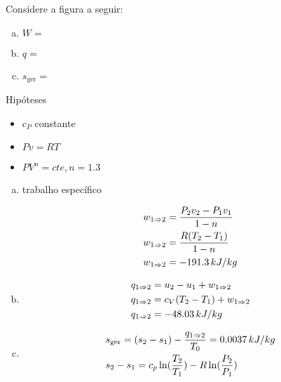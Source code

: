 \documentclass[a4paper,12pt]{memoir}
\begin{document}
\begin{Exerc}[8.117 6\pa Ed.]
Considere a figura a seguir:


\begin{enumerate}[a)]
 \item $W =$
 \item $q =$
 \item $s_{\operatorname{ger}} =$
\end{enumerate}
\end{Exerc}

\begin{sol}
Hipóteses

\begin{itemize}
\item $c_{P}$ constante
\item $Pv = RT$
\item $PV^{n}=cte, n = 1.3$
\end{itemize}

\begin{enumerate}[a)]
 \item trabalho específico

\[
\begin{gathered}
  w_{1 \imp 2} = \frac{P_2 v_2 - P_1 v_1}{1-n} \hfill \\
  w_{1 \imp 2} = \frac{R(T_2 - T_1)}{1-n} \hfill \\
  w_{1 \imp 2} = -191.3\,kJ/kg \hfill \\
\end{gathered} 
\]

 \item

\[
\begin{gathered}
  q_{1 \imp 2} = u_2 - u_1 + w_{1 \imp 2} \hfill \\
  q_{1 \imp 2} = c_V (T_2 - T_1) + w_{1 \imp 2} \hfill \\ 
  q_{1 \imp 2} = -48.03\,kJ/kg \hfill \\ 
\end{gathered} 
\]

 \item

\[
\begin{gathered}
  s_{\operatorname{ger}} = (s_2 - s_1) - \frac{q _{1 \imp 2}}{T_0} = 0.0037\,kJ/kg \hfill \\
  s_2 - s_1 = c_p \ln(\frac{T_2}{T_1}) - R\ln(\frac{P_2}{P_1}) \hfill \\ 
\end{gathered} 
\]

\end{enumerate}
\end{sol}
\end{document}

